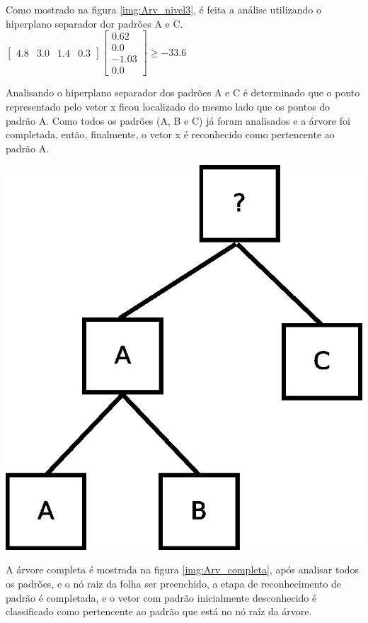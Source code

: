 Como mostrado na figura \ref{img:Arv_nivel3}, é feita a análise utilizando o hiperplano separador dor padrões A e C.
$ \begin{bmatrix}
4.8 & 3.0 & 1.4 & 0.3 
\end{bmatrix}
\begin{bmatrix}
0.62
\\ 
0.0
\\
-1.03
\\
0.0 
\end{bmatrix}
\geq  -33.6 $ 

Analisando o hiperplano separador dos padrões A e C é determinado que o ponto representado pelo vetor x ficou localizado do mesmo lado que os pontos do padrão A. Como todos os padrões (A, B e C) já foram analisados e a árvore foi completada, então, finalmente, o vetor x é reconhecido como pertencente ao padrão A.

\begin{center}
	\includegraphics[scale=0.4]{graficos/arvore_nivel3}
	\label{img:Arv_completa}
\end{center}

A árvore completa é mostrada na figura \ref{img:Arv_completa}, após analisar todos os padrões, e o nó raiz da folha ser preenchido, a etapa de reconhecimento de padrão é completada, e o vetor com padrão inicialmente desconhecido é classificado como pertencente ao padrão que está no nó raíz da árvore.

